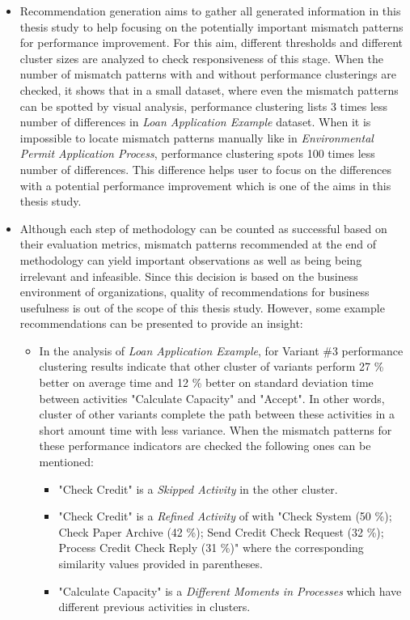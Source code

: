\begin{itemize}
	\item Recommendation generation aims to gather all generated information in this thesis study to help focusing on the potentially important mismatch patterns for performance improvement. For this aim, different thresholds and different cluster sizes are analyzed to check responsiveness of this stage. When the number of mismatch patterns with and without performance clusterings are checked, it shows that in a small dataset, where even the mismatch patterns can be spotted by visual analysis, performance clustering lists 3 times less number of differences in \textit{Loan Application Example} dataset. When it is impossible to locate mismatch patterns manually like in \textit{Environmental Permit Application Process}, performance clustering spots 100 times less number of differences. This difference helps user to focus on the differences with a potential performance improvement which is one of the aims in this thesis study.
	\item Although each step of methodology can be counted as successful based on their evaluation metrics, mismatch patterns recommended at the end of methodology can yield important observations as well as being being irrelevant and infeasible. Since this decision is based on the business environment of organizations, quality of recommendations for business usefulness is out of the scope of this thesis study. However, some example recommendations can be presented to provide an insight:
	\begin{itemize}
	\item In the analysis of \textit{Loan Application Example}, for Variant \#3 performance clustering results indicate that other cluster of variants perform 27 \% better on average time and 12 \% better on standard deviation time between activities "Calculate Capacity" and "Accept". In other words, cluster of other variants complete the path between these activities in a short amount time with less variance. When the mismatch patterns for these performance indicators are checked the following ones can be mentioned:
		\begin{itemize}
		\item "Check Credit" is a \textit{Skipped Activity} in the other cluster.
		\item "Check Credit" is a \textit{Refined Activity} of with "Check System (50 \%); Check Paper Archive (42 \%); Send Credit Check Request (32 \%); Process Credit Check Reply (31 \%)" where the corresponding similarity values provided in parentheses.
		\item "Calculate Capacity" is a \textit{Different Moments in Processes} which have different previous activities in clusters. 

\end{itemize}
\end{itemize}
\end{itemize}
